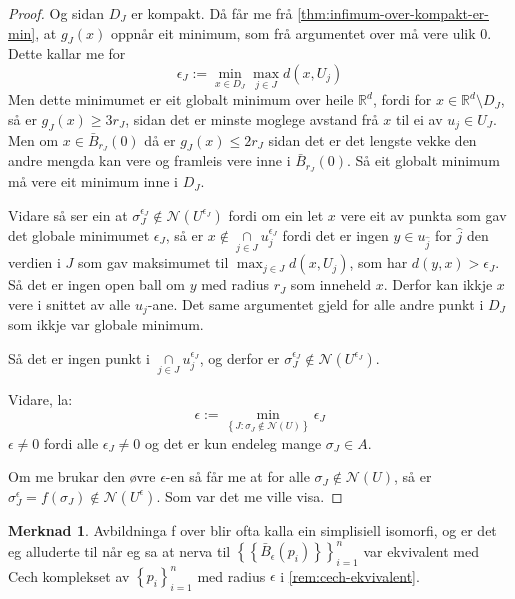 \documentclass[a4paper, 12pt, norsk]{article}
\theoremstyle{plain}
\theoremstyle{definition}
\newtheorem{remark}[theorem]{Merknad}
\newcommand{\Rb}{\mathbb{R}}
\newcommand{\Nc}{\mathcal{N}}
\newcommand{\intersect}{ \mathop{\cap}\limits } %
\newcommand{\set}[1]{ \left \{ #1 \right \} } %
\begin{document}
\begin{proof}
	Og sidan \( D_J \) er kompakt. Då får me frå \autoref{thm:infimum-over-kompakt-er-min}, at \( g_J(x) \) oppnår eit minimum, som frå argumentet over må vere ulik \( 0 \). Dette kallar me for
	\[
		\epsilon_J := \min_{x \in D_J} \max_{j \in J} d(x, U_j) 
	\]
	Men dette minimumet er eit globalt minimum over heile \( \Rb^d \), fordi for \( x \in \Rb^d \setminus D_J \), så er \( g_J(x) \geq 3r_J \), sidan det er minste moglege avstand frå \( x \) til ei av \( u_j \in U_J \). Men om \( x \in \bar{B}_{r_J}(0) \) då er \( g_J(x) \leq 2r_J \) sidan det er det lengste vekke den andre mengda kan vere og framleis vere inne i \( \bar{B}_{r_J}(0) \). Så eit globalt minimum må vere eit minimum inne i \( D_J \).

	Vidare så ser ein at \( \sigma_J^{\epsilon_J} \not\in \Nc(U^{\epsilon_J}) \) fordi om ein let \( x \) vere eit av punkta som gav det globale minimumet \( \epsilon_J \), så er \( x \not\in \intersect_{j \in J} u_j^{\epsilon_J} \) fordi det er ingen \( y \in  u_{\hat{j}} \) for \( \hat{j} \) den verdien i \( J \) som gav maksimumet til \( \max_{j \in J} d(x, U_j) \), som har \( d(y, x) > \epsilon_J \). Så det er ingen open ball om \( y \) med radius \( r_J \) som inneheld \( x \). Derfor kan ikkje \( x \) vere i snittet av alle \( u_j \)-ane. Det same argumentet gjeld for alle andre punkt i \( D_J \) som ikkje var globale minimum.
	
	Så det er ingen punkt i \( \intersect_{j \in J} u_j^{\epsilon_J} \), og derfor er \( \sigma_J^{\epsilon_J} \not\in \Nc(U^{\epsilon_J}) \).

	Vidare, la: 
	\[
		\epsilon := \min_{\set{J : \sigma_J \not\in \Nc(U)}} \epsilon_J
	\]
	\( \epsilon \neq 0 \) fordi alle \( \epsilon_J \neq 0 \) og det er kun endeleg mange \( \sigma_J \in A \).

	Om me brukar den øvre \( \epsilon \)-en så får me at for alle \( \sigma_J \not\in \Nc(U) \), så er \( \sigma_J^{\epsilon}=f(\sigma_J) \not\in \Nc(U^{\epsilon}) \). Som var det me ville visa.

\end{proof}

\begin{remark}
	Avbildninga f over blir ofta kalla ein simplisiell isomorfi, og er det eg alluderte til når eg sa at nerva til \( \set{\set{\bar{B}_\epsilon(p_i)}}_{i=1}^n \) var ekvivalent med Cech komplekset av \( \set{p_i}_{i=1}^n \) med radius \( \epsilon \) i \autoref{rem:cech-ekvivalent}.
\end{remark}
\end{document}
